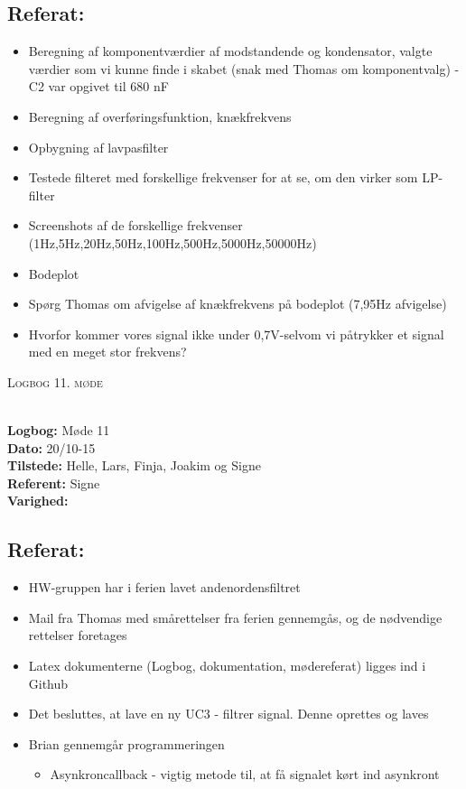 \documentclass[a4paper,11pt,oneside]{memoir}
\begin{document}
\subsection{Referat:}
\begin{itemize}
\item Beregning af komponentværdier af modstandende og kondensator, valgte værdier som vi kunne finde i skabet (snak med Thomas om komponentvalg) - C2 var opgivet til 680 nF
\item Beregning af overføringsfunktion, knækfrekvens
\item Opbygning af lavpasfilter
\item Testede filteret med forskellige frekvenser for at se, om den virker som LP-filter
\item Screenshots af de forskellige frekvenser (1Hz,5Hz,20Hz,50Hz,100Hz,500Hz,5000Hz,50000Hz)
\item Bodeplot
\item Spørg Thomas om afvigelse af knækfrekvens på bodeplot (7,95Hz afvigelse)
\item Hvorfor kommer vores signal ikke under 0,7V-selvom vi påtrykker et signal med en meget stor frekvens?
\end{itemize}

\newpage


\begin{center} 
\huge{\textsc{Logbog 11. møde}}
\end{center}

\textbf{ }
\\
\textbf{Logbog:} Møde 11
\\
\textbf{Dato:} 20/10-15
\\
\textbf{Tilstede:} Helle, Lars, Finja, Joakim og Signe
\\
\textbf{Referent:} Signe
\\
\textbf{Varighed:} 
\\

\subsection{Referat:}
\begin{itemize}
\item HW-gruppen har i ferien lavet andenordensfiltret
\item Mail fra Thomas med smårettelser fra ferien gennemgås, og de nødvendige rettelser foretages
\item Latex dokumenterne (Logbog, dokumentation, mødereferat) ligges ind i Github 
\item Det besluttes, at lave en ny UC3 - filtrer signal. Denne oprettes og laves
\item Brian gennemgår programmeringen
\begin{itemize}
\item Asynkroncallback - vigtig metode til, at få signalet kørt ind asynkront
\end{itemize}
\end{itemize}
\end{document}
